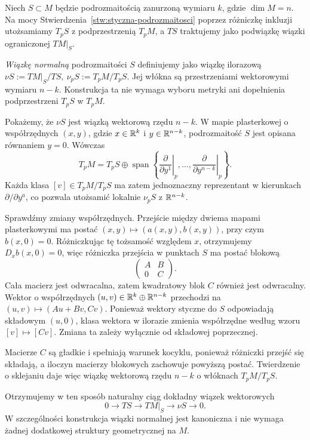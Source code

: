 \begin{przyklad}
Niech $S\subset M$ będzie podrozmaitością zanurzoną wymiaru $k$,
gdzie $\dim M=n$. Na mocy Stwierdzenia~\ref{stw:styczna-podrozmaitosci}
poprzez różniczkę inkluzji utożsamiamy
$T_pS$ z podprzestrzenią $T_pM$, a $TS$ traktujemy jako
podwiązkę wiązki ograniczonej $TM|_S$.

\emph{Wiązkę normalną} podrozmaitości $S$ definiujemy jako
wiązkę ilorazową $\nu S:=TM|_S/TS, \ \nu_pS:=T_pM/T_pS$.
Jej włókna są przestrzeniami wektorowymi wymiaru $n-k$.
Konstrukcja ta nie wymaga wyboru metryki ani dopełnienia
podprzestrzeni $T_pS$ w $T_pM$.

Pokażemy, że $\nu S$ jest wiązką wektorową rzędu $n-k$.
W mapie plasterkowej o współrzędnych $(x,y)$, gdzie
$x\in\mathbb{R}^k$ i $y\in\mathbb{R}^{n-k}$, podrozmaitość $S$ jest
opisana równaniem $y=0$. Wówczas
\[
T_pM=T_pS\oplus
\operatorname{span}\left\{
\left.\frac{\partial}{\partial y^1}\right|_p,
\ldots,
\left.\frac{\partial}{\partial y^{n-k}}\right|_p
\right\}.
\]
Każda klasa $[v]\in T_pM/T_pS$ ma zatem jednoznaczny
reprezentant w kierunkach $\partial/\partial y^a$,
co pozwala utożsamić lokalnie $\nu_pS$ z $\mathbb{R}^{n-k}$.

Sprawdźmy zmiany współrzędnych. Przejście między dwiema
mapami plasterkowymi ma postać $(x,y)\longmapsto(a(x,y),b(x,y))$,
przy czym $b(x,0)=0$. Różniczkując tę tożsamość
względem $x$, otrzymujemy $D_xb(x,0)=0$, więc
różniczka przejścia w punktach $S$ ma postać blokową
\[
\begin{pmatrix}
A&B\\
0&C
\end{pmatrix}.
\]
Cała macierz jest odwracalna, zatem kwadratowy blok
$C$ również jest odwracalny. Wektor o współrzędnych
$(u,v)\in\mathbb{R}^k\oplus\mathbb{R}^{n-k}$ przechodzi na $(u,v)\longmapsto(Au+Bv,Cv)$.
Ponieważ wektory styczne do $S$ odpowiadają
składowym $(u,0)$, klasa wektora w ilorazie
zmienia współrzędne według wzoru $[v]\longmapsto[Cv]$.
Zmiana ta zależy wyłącznie od składowej poprzecznej.

Macierze $C$ są gładkie i spełniają warunek kocyklu,
ponieważ różniczki przejść się składają, a iloczyn
macierzy blokowych zachowuje powyższą postać.
Twierdzenie o sklejaniu daje więc wiązkę wektorową
rzędu $n-k$ o włóknach $T_pM/T_pS$.

Otrzymujemy w ten sposób naturalny ciąg dokładny
wiązek wektorowych
\[
0\longrightarrow TS
\longrightarrow TM|_S
\longrightarrow \nu S
\longrightarrow 0.
\]
W szczególności konstrukcja wiązki normalnej jest
kanoniczna i nie wymaga żadnej dodatkowej struktury
geometrycznej na $M$.
\end{przyklad}


